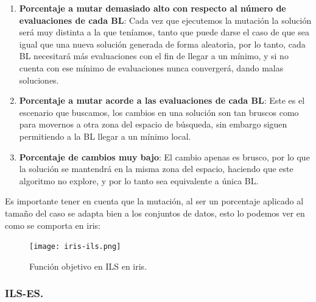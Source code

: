 \documentclass[12pt, spanish]{article}
\begin{document}
\begin{enumerate}
	\item \textbf{Porcentaje a mutar demasiado alto con respecto al número de evaluaciones de cada BL}: Cada vez que ejecutemos la mutación la solución será muy distinta a la que teníamos, tanto que puede darse el caso de que sea igual que una nueva solución generada de forma aleatoria, por lo tanto, cada BL necesitará más evaluaciones con el fin de llegar a un mínimo, y si no cuenta con ese mínimo de evaluaciones nunca convergerá, dando malas soluciones.
	\item \textbf{Porcentaje a mutar acorde a las evaluaciones de cada BL}: Este es el escenario que buscamos, los cambios en una solución son tan bruscos como para movernos a otra zona del espacio de búsqueda, sin embargo siguen permitiendo a la BL llegar a un mínimo local.
	\item \textbf{Porcentaje de cambios muy bajo}: El cambio apenas es brusco, por lo que la solución se mantendrá en la misma zona del espacio, haciendo que este algoritmo no explore, y por lo tanto sea equivalente a única BL.
\end{enumerate}


Es importante tener en cuenta que la mutación, al ser un porcentaje aplicado al tamaño del caso se adapta bien a los conjuntos de datos, esto lo podemos ver en como se comporta en iris:

\begin{figure}[H]
	\centering
	\texttt{[image: iris-ils.png]}
	
	\caption{Función objetivo en ILS en iris.}
	\label{fig:ils-cmp2}
\end{figure}

\subsubsection{ILS-ES.}
\end{document}
